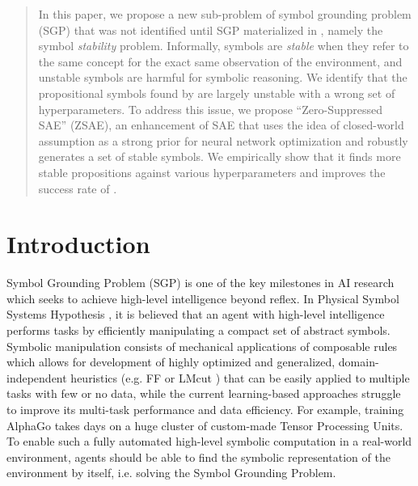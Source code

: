 \begin{abstract}
In this paper, we propose a new sub-problem of symbol grounding problem (SGP)
that was not identified until SGP materialized in \latentplanner, namely
the symbol \emph{stability} problem.  Informally, symbols are
\emph{stable} when they refer to the same concept for the exact same
observation of the environment, and unstable symbols are harmful for symbolic
reasoning.
We identify that the propositional symbols found by \latentplanner 
are largely unstable with a wrong set of hyperparameters.
% 
To address this issue, we propose ``Zero-Suppressed SAE''
(ZSAE), an enhancement of SAE that uses the idea of closed-world
assumption as a strong prior for neural network optimization 
and robustly generates a set of stable symbols.
We empirically show that it finds more stable propositions
against various hyperparameters and improves the success rate of
\latentplanner.
\end{abstract}


\section{Introduction}


Symbol Grounding Problem (SGP) \cite{harnad1990symbol,Steels2008} is one of the key milestones in AI research
which seeks to achieve high-level intelligence beyond reflex.
In Physical Symbol Systems Hypothesis \cite{newell2007computer}, it is believed that
an agent with high-level intelligence performs tasks by efficiently manipulating a compact set of abstract symbols.
% 
Symbolic manipulation consists of mechanical applications of composable rules which allows for
development of highly optimized and generalized, domain-independent heuristics (e.g. FF \cite{Hoffmann01} or LMcut \cite{Helmert2009})
that can be easily applied to multiple tasks with few or no data,
while the current learning-based approaches struggle to improve its multi-task performance and data efficiency.
For example, training AlphaGo \cite{alphago} takes days on a huge cluster of custom-made Tensor Processing Units.
% 
To enable such a fully automated high-level symbolic computation in a real-world environment,
agents should be able to find the symbolic representation of the environment by itself, i.e. solving the Symbol Grounding Problem.

